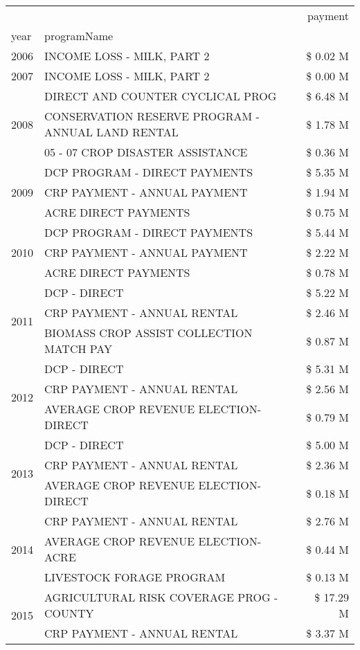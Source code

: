 \begin{tabular}{llr}
\toprule
 &  & payment \\
year & programName &  \\
\midrule
2006 & INCOME LOSS - MILK, PART 2 & \$ 0.02 M \\
\cline{1-3}
2007 & INCOME LOSS - MILK, PART 2 & \$ 0.00 M \\
\cline{1-3}
\multirow[t]{3}{*}{2008} & DIRECT AND COUNTER CYCLICAL PROG & \$ 6.48 M \\
 & CONSERVATION RESERVE PROGRAM - ANNUAL LAND RENTAL & \$ 1.78 M \\
 & 05 - 07 CROP DISASTER ASSISTANCE & \$ 0.36 M \\
\cline{1-3}
\multirow[t]{3}{*}{2009} & DCP PROGRAM - DIRECT PAYMENTS & \$ 5.35 M \\
 & CRP PAYMENT - ANNUAL PAYMENT & \$ 1.94 M \\
 & ACRE DIRECT PAYMENTS & \$ 0.75 M \\
\cline{1-3}
\multirow[t]{3}{*}{2010} & DCP PROGRAM - DIRECT PAYMENTS & \$ 5.44 M \\
 & CRP PAYMENT - ANNUAL PAYMENT & \$ 2.22 M \\
 & ACRE DIRECT PAYMENTS & \$ 0.78 M \\
\cline{1-3}
\multirow[t]{3}{*}{2011} & DCP - DIRECT & \$ 5.22 M \\
 & CRP PAYMENT - ANNUAL RENTAL & \$ 2.46 M \\
 & BIOMASS CROP ASSIST COLLECTION MATCH PAY & \$ 0.87 M \\
\cline{1-3}
\multirow[t]{3}{*}{2012} & DCP - DIRECT & \$ 5.31 M \\
 & CRP PAYMENT - ANNUAL RENTAL & \$ 2.56 M \\
 & AVERAGE CROP REVENUE ELECTION-DIRECT & \$ 0.79 M \\
\cline{1-3}
\multirow[t]{3}{*}{2013} & DCP - DIRECT & \$ 5.00 M \\
 & CRP PAYMENT - ANNUAL RENTAL & \$ 2.36 M \\
 & AVERAGE CROP REVENUE ELECTION-DIRECT & \$ 0.18 M \\
\cline{1-3}
\multirow[t]{3}{*}{2014} & CRP PAYMENT - ANNUAL RENTAL & \$ 2.76 M \\
 & AVERAGE CROP REVENUE ELECTION-ACRE & \$ 0.44 M \\
 & LIVESTOCK FORAGE PROGRAM & \$ 0.13 M \\
\cline{1-3}
\multirow[t]{3}{*}{2015} & AGRICULTURAL RISK COVERAGE PROG - COUNTY & \$ 17.29 M \\
 & CRP PAYMENT - ANNUAL RENTAL & \$ 3.37 M \\

\end{tabular}
